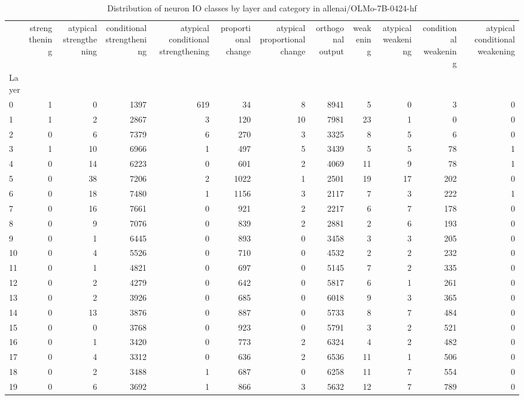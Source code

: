 \begin{table}
\caption{Distribution of neuron IO classes by layer and category in allenai/OLMo-7B-0424-hf}
\label{tab:allenai/OLMo-7B-0424-hf}
\begin{tabular}{lrrrrrrrrrrr}
 & strengthening & atypical strengthening & conditional strengthening & atypical conditional strengthening & proportional change & atypical proportional change & orthogonal output & weakening & atypical weakening & conditional weakening & atypical conditional weakening \\
Layer &  &  &  &  &  &  &  &  &  &  &  \\
0 & 1 & 0 & 1397 & 619 & 34 & 8 & 8941 & 5 & 0 & 3 & 0 \\
1 & 1 & 2 & 2867 & 3 & 120 & 10 & 7981 & 23 & 1 & 0 & 0 \\
2 & 0 & 6 & 7379 & 6 & 270 & 3 & 3325 & 8 & 5 & 6 & 0 \\
3 & 1 & 10 & 6966 & 1 & 497 & 5 & 3439 & 5 & 5 & 78 & 1 \\
4 & 0 & 14 & 6223 & 0 & 601 & 2 & 4069 & 11 & 9 & 78 & 1 \\
5 & 0 & 38 & 7206 & 2 & 1022 & 1 & 2501 & 19 & 17 & 202 & 0 \\
6 & 0 & 18 & 7480 & 1 & 1156 & 3 & 2117 & 7 & 3 & 222 & 1 \\
7 & 0 & 16 & 7661 & 0 & 921 & 2 & 2217 & 6 & 7 & 178 & 0 \\
8 & 0 & 9 & 7076 & 0 & 839 & 2 & 2881 & 2 & 6 & 193 & 0 \\
9 & 0 & 1 & 6445 & 0 & 893 & 0 & 3458 & 3 & 3 & 205 & 0 \\
10 & 0 & 4 & 5526 & 0 & 710 & 0 & 4532 & 2 & 2 & 232 & 0 \\
11 & 0 & 1 & 4821 & 0 & 697 & 0 & 5145 & 7 & 2 & 335 & 0 \\
12 & 0 & 2 & 4279 & 0 & 642 & 0 & 5817 & 6 & 1 & 261 & 0 \\
13 & 0 & 2 & 3926 & 0 & 685 & 0 & 6018 & 9 & 3 & 365 & 0 \\
14 & 0 & 13 & 3876 & 0 & 887 & 0 & 5733 & 8 & 7 & 484 & 0 \\
15 & 0 & 0 & 3768 & 0 & 923 & 0 & 5791 & 3 & 2 & 521 & 0 \\
16 & 0 & 1 & 3420 & 0 & 773 & 2 & 6324 & 4 & 2 & 482 & 0 \\
17 & 0 & 4 & 3312 & 0 & 636 & 2 & 6536 & 11 & 1 & 506 & 0 \\
18 & 0 & 2 & 3488 & 1 & 687 & 0 & 6258 & 11 & 7 & 554 & 0 \\
19 & 0 & 6 & 3692 & 1 & 866 & 3 & 5632 & 12 & 7 & 789 & 0 \\

\end{tabular}
\end{table}
